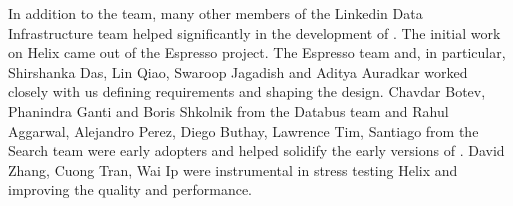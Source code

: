 In addition to the \helix team, many other members of the Linkedin Data Infrastructure team 
helped significantly in the development of \helix. 
The initial work on Helix came out of the Espresso project. The Espresso team
and, in particular, Shirshanka Das, Lin Qiao, Swaroop Jagadish and Aditya
Auradkar worked closely with us defining requirements and shaping the design. 
Chavdar Botev, Phanindra Ganti and Boris Shkolnik from the Databus team and Rahul Aggarwal, Alejandro Perez, 
Diego Buthay, Lawrence Tim, Santiago from the Search team were 
early adopters and helped solidify the early versions of \helix. 
David Zhang, Cuong Tran, Wai Ip were instrumental in stress
testing Helix and improving the quality and performance.
